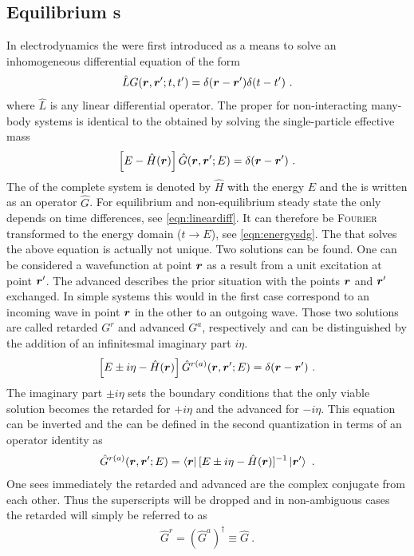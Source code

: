 \subsection{Equilibrium \cgfnc s}
In electrodynamics the \gfnc{} were first introduced as a means to solve an inhomogeneous differential equation of the form
\begin{align}
\hat{L}G(\boldsymbol{r},\boldsymbol{r}';t,t') = \delta(\boldsymbol{r}-\boldsymbol{r}')\delta(t-t')\ .
\label{eqn:lineardiff}
\end{align}
where $\hat{L}$ is any linear differential operator. The proper \gfnc{} for non-interacting many-body systems is identical to the \gfnc{} obtained by solving the single-particle effective mass \sdg{} \cite{ferry1999transport}
\begin{align}
\left[ E -\hat{H}(\boldsymbol{r})\right] \hat{G}(\boldsymbol{r},\boldsymbol{r}';E) = \delta (\boldsymbol{r}-\boldsymbol{r}')\ .
\label{eqn:energysdg}
\end{align}
The \hamil{} of the complete system is denoted by $\hat{H}$ with the energy $E$ and the \gfnc{} is written as an operator $\hat{G}$.
For equilibrium \cite{fetter2003quantum} and non-equilibrium steady state \cite{haug2008quantum} the \gfnc{} only depends on time differences, see \cref{eqn:lineardiff}. It can therefore be \textsc{Fourier} transformed to the energy domain ($t \rightarrow E$), see \cref{eqn:energysdg}. The \gfnc{} that solves the above equation is actually not unique. Two solutions can be found. One can be considered a wavefunction at point $\boldsymbol{r}$ as a result from a unit excitation at point $\boldsymbol{r}'$. The advanced \gfnc{} describes the prior situation with the points $\boldsymbol{r}$ and $\boldsymbol{r}'$ exchanged. In simple systems this would in the first case correspond to an incoming wave in point $\boldsymbol{r}$ in the other to an outgoing wave.
Those two solutions are called retarded \gfnc{} $G^r$ and advanced \gfnc{} $G^a$, respectively and can be distinguished by the addition of an infinitesmal imaginary part $i\eta$. \begin{align}
\left[ E \pm i \eta -\hat{H}(\boldsymbol{r})\right] \hat{G}^{r(a)}(\boldsymbol{r},\boldsymbol{r}';E) = \delta (\boldsymbol{r}-\boldsymbol{r}')\ .
\end{align}
The imaginary part $\pm i\eta$ sets the boundary conditions that the only viable solution becomes the retarded \gfnc{} for $+i\eta$ and the advanced \gfnc{} for $-i \eta$.
This equation can be inverted and the \gfnc{} can be defined in the second quantization in terms of an operator identity as
\begin{align}
\hat{G}^{r(a)}(\boldsymbol{r},\boldsymbol{r}';E) = \left< \boldsymbol{r} \right| [E\pm i \eta - \hat{H}(\boldsymbol{r})]^{-1} \left| \boldsymbol{r}' \right>\ .
\end{align}
One sees immediately the retarded and advanced \gfnc{} are the complex conjugate from each other. Thus the superscripts will be dropped and in non-ambiguous cases the retarded \gfnc{} will simply be referred to as \gfnc{}
\begin{align}
\hat{G}^r = (\hat{G}^a)^{\dagger} \equiv \hat{G}\ .
\end{align}
